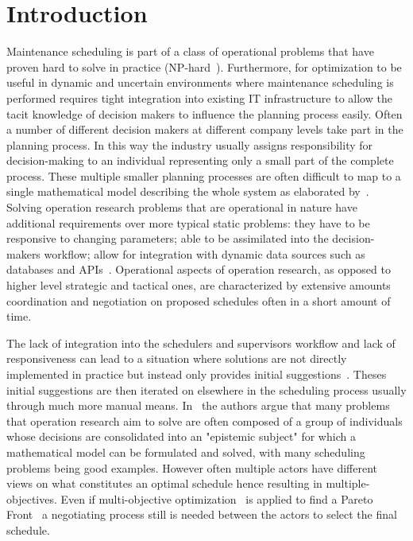 \section{Introduction}
Maintenance scheduling is part of a class of operational problems that have proven hard to solve in practice (NP-hard~\citep{garey1979computers}).
Furthermore, for optimization to be useful in dynamic and uncertain environments where maintenance scheduling 
is performed requires tight integration into existing IT infrastructure to allow the  tacit knowledge of decision makers to influence
the planning process easily. Often a number of different decision makers at different company levels take part in the
planning process. In this way the industry usually assigns responsibility for decision-making to an individual
representing only a small part of the complete process. These multiple smaller planning processes are often difficult
to map to a single mathematical model describing the whole system as elaborated by~\citep{barthelemy2002human}. Solving
operation research problems that are operational in nature have additional requirements over more typical static
problems: they have to be responsive to changing parameters; able to be assimilated into the decision-makers workflow;
allow for integration with dynamic data sources such as databases and APIs~\citep{meignan_review_2015}. Operational
aspects of operation research, as opposed to higher level strategic and tactical ones, are characterized by extensive
amounts coordination and negotiation on proposed schedules often in a short amount of time.

The lack of integration into the schedulers and supervisors workflow and lack of responsiveness can lead to a situation 
where solutions are not directly implemented in practice but instead only provides initial suggestions~\citep{meignan_review_2015}.
Theses initial suggestions are then iterated on elsewhere in the scheduling process usually through much more manual means. 
In~\citep{barthelemy2002human} the authors argue that many problems that operation research aim to solve are often composed
of a group of individuals whose decisions are consolidated into an "epistemic subject" for which a mathematical model can be formulated
and solved, with many scheduling problems being good examples. However often multiple actors have different
views on what constitutes an optimal schedule hence resulting in multiple-objectives. Even if multi-objective
optimization~\citep{ehrgott2002multiple} is applied to find a Pareto Front~\citep{Pareto1897} a negotiating process
still is needed between the actors to select the final schedule. 


